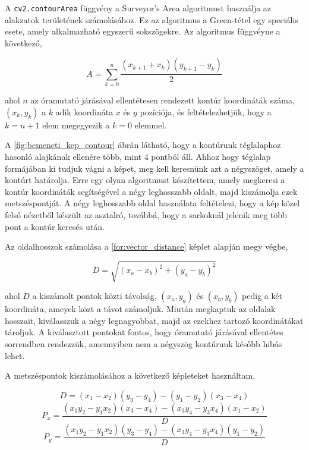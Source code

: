 \par A \lstinline{cv2.contourArea} függvény a Surveyor's Area algoritmust \cite{braden1986surveyor} használja az alakzatok területének számolásához. Ez az algoritmus a Green-tétel egy speciális esete, amely alkalmazható egyszerű sokszögekre.
\newline Az algoritmus függvéyne a következő,

\begin{equation}
    A = \sum^n_{k=0}\frac{(x_{k+1} + x_k)(y_{k+1} - y_k)}{2}
    \label{for:green_formula}
\end{equation}

\par ahol $n$ az óramutató járásával ellentétesen rendezett kontúr koordináták száma, $(x_k, y_k)$ a $k$ adik koordináta $x$ és $y$ pozíciója, és feltételezhetjük, hogy a $k = n+1$ elem megegyezik a $k = 0$ elemmel.

\par A \ref{fig:bemeneti_kep_contour} ábrán látható, hogy a kontúrunk téglalaphoz hasonló alajkának ellenére több, mint 4 pontból áll. Ahhoz hogy téglalap formájában ki tudjuk vágni a képet, meg kell keresnünk azt a négyszöget, amely a kontúrt határolja. Erre egy olyan algoritmust készítettem, amely megkeresi a kontúr koordináták segítségével a négy leghosszabb oldalt, majd kiszámolja ezek metszéspontját. A négy leghosszabb oldal használata feltételezi, hogy a kép közel felső nézetből készült az asztalró, továbbá, hogy a sarkoknál jelenik meg több pont a kontúr keresés után.
\par Az oldalhosszok számolása a \ref{for:vector_distance} képlet alapján megy végbe,

\begin{equation}
    D = \sqrt{(x_a-x_b)^2 + (y_a-y_b)^2}
    \label{for:vector_distance}
\end{equation}

\par ahol $D$ a kiszámolt pontok közti távolság, $(x_a,y_a)$ és $(x_b,y_b)$ pedig a két koordináta, ameyek közt a távot számoljuk. Miután megkaptuk az oldalak hosszait, kiválasszuk a négy legnagyobbat, majd az ezekhez tartozó koordinátákat tároljuk. A kiválasztott pontokat fontos, hogy óramutató járásával ellentétes sorrendben rendezzük, amennyiben nem a négyszög kontúrunk később hibás lehet.
\par A metszéspontok kiszámolásához a következő képleteket \cite{line_line} használtam,

\begin{equation}
    D = (x_1 - x_2)(y_3 - y_4) - (y_1 - y_2)(x_3 - x_4)
    \label{for:vector_intersection_denominator}
\end{equation}
\begin{equation}
    P_x = \frac{(x_1y_2 - y_1x_2)(x_3 - x_4) - (x_3y_4 - y_3x_4)(x_1 - x_2)}{D}
    \label{for:vector_intersection_point_x}
\end{equation}
\begin{equation}
    P_y = \frac{(x_1y_2 - y_1x_2)(y_3 - y_4) - (x_3y_4 - y_3x_4)(y_1 - y_2)}{D}
    \label{for:vector_intersection_point_y}
\end{equation}


